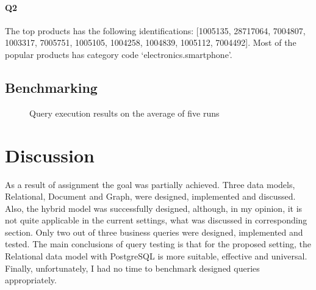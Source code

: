 \documentclass[conference]{IEEEtran}
\begin{document}
\paragraph{Q2} The top products has the following identifications: [1005135,
28717064,
7004807,
1003317,
7005751,
1005105,
1004258,
1004839,
1005112,
7004492]. Most of the popular products has category code `electronics.smartphone'.

\subsection{Benchmarking}



\begin{figure}[hbthbt]
    \centering
    \pgfplotsset{compat=1.10}
    \caption{Query execution results on the average of five runs}\label{fig:queies_run}
\end{figure}


\section{Discussion}
As a result of assignment the goal was partially achieved. Three data models, Relational, Document and Graph, were designed, implemented and discussed. Also, the hybrid model was successfully designed, although, in my opinion, it is not quite applicable in the current settings, what was discussed in corresponding section. Only two out of three business queries were designed, implemented and tested. The main conclusions of query testing is that for the proposed setting, the Relational data model with PostgreSQL is more suitable, effective and universal. Finally, unfortunately, I had no time to benchmark designed queries appropriately.
\end{document}
